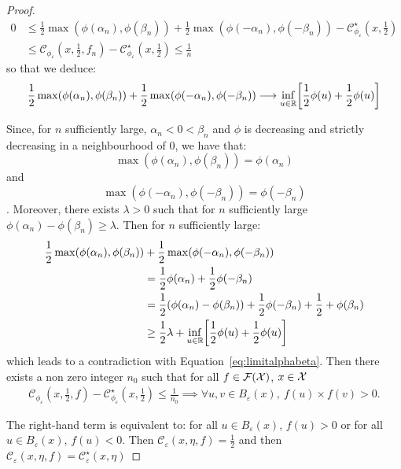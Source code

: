 \begin{proof}
    \begin{align*}
         0&\leq\frac12\max\left(\phi(\alpha_n),\phi(\beta_n)\right)+\frac12\max\left(\phi(-\alpha_n),\phi(-\beta_n)\right)- \mathcal{C}^\star_{\phi_\varepsilon}(x,\frac12)\\
         &\leq \mathcal{C}_{\phi_\varepsilon}(x,\frac12,f_n) - \mathcal{C}_{\phi_\varepsilon}^\star(x,\frac12)\leq \frac1n
    \end{align*}
    so that we deduce:
    \begin{align}
    \label{eq:limitalphabeta}
     \frac12\max\left(\phi(\alpha_n),\phi(\beta_n)\right)+\frac12\max\left(\phi(-\alpha_n),\phi(-\beta_n)\right)\longrightarrow \inf_{u\in\RR}\left[\frac12 \phi(u)+\frac12\phi(u)\right]
    \end{align}
    
    Since, for $n$ sufficiently large, $\alpha_n<0<\beta_n$ and $\phi$ is decreasing  and strictly decreasing in a neighbourhood of $0$, we have that:
     $$\max\left(\phi(\alpha_n),\phi(\beta_n)\right) = \phi(\alpha_n)$$ and 
     $$\max\left(\phi(-\alpha_n),\phi(-\beta_n)\right) = \phi(-\beta_n)$$. Moreover, there exists $\lambda>0$ such that for $n$ sufficiently large $\phi(\alpha_n) - \phi(\beta_n)\geq \lambda$. Then for $n$ sufficiently large:
    \begin{align*}
        \frac12\max\left(\phi(\alpha_n),\phi(\beta_n)\right)&+\frac12\max\left(\phi(-\alpha_n),\phi(-\beta_n)\right)\\
         &= \frac{1}{2} \phi(\alpha_n) +\frac12 \phi(-\beta_n)\\
        &= \frac{1}{2} \left(\phi(\alpha_n)- \phi(\beta_n)\right)+\frac12 \phi(-\beta_n)+\frac{1}{2}+ \phi(\beta_n)\\
        &\geq \frac12\lambda +\inf_{u\in\RR}\left[\frac12 \phi(u)+\frac12\phi(u)\right]
    \end{align*}
    which leads to a contradiction with Equation~\ref{eq:limitalphabeta}. Then there exists a non zero integer $n_0$ such that for all $f\in\mathcal{F}(\mathcal{X})$, $x\in\mathcal{X}$
    \begin{align*}
        \mathcal{C}_{\phi_\varepsilon}(x,\frac12,f) - \mathcal{C}_{\phi_\varepsilon}^\star(x,\frac12)\leq \frac{1}{n_0} \implies \forall u,v\in B_\varepsilon(x),~ f(u)\times f(v)> 0.
    \end{align*}
    
    The right-hand term is equivalent to: for all $u\in B_\varepsilon(x)$, $f(u)>0$ or for all $u\in B_\varepsilon(x)$, $f(u)<0$.  Then $\mathcal{C}_\varepsilon(x,\eta,f) =\frac12$ and then $\mathcal{C}_\varepsilon(x,\eta,f) = \mathcal{C}_\varepsilon^\star(x,\eta)$
    

\end{proof}
